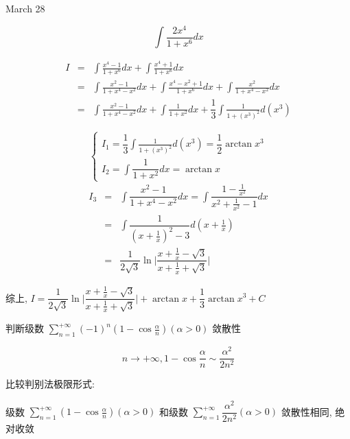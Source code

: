 \textcolor{purplea}{March 28}

\begin{example}[][Exam: 29.4.12]
	$$\int\dfrac{2x^4}{1+x^6}dx$$
\end{example}

\begin{solution}
	
	\begin{eqnarray*}
		I & = & \int\frac{x^4-1}{1+x^6}dx + \int\frac{x^4+1}{1+x^6}dx\\
		  & = & \int\frac{x^2-1}{1+x^4-x^2}dx + \int\frac{x^4-x^2+1}{1+x^6}dx + \int\frac{x^2}{1+x^4-x^2}dx\\
		  & = & \int\frac{x^2-1}{1+x^4-x^2}dx + \int\frac{1}{1+x^2}dx + \dfrac{1}{3}\int\frac{1}{1+(x^3)^{2}}d(x^{3})
	\end{eqnarray*}
	
	$$\begin{cases}
	  I_{1}  =  \displaystyle{\dfrac{1}{3}\int\frac{1}{1+(x^3)^{2}}d(x^{3})} = \dfrac{1}{2}\arctan x^{3}\\
	  I_{2}  =  \displaystyle{\int\dfrac{1}{1+x^2}dx} = \arctan x
	\end{cases}$$
	\begin{eqnarray*}
		I_{3} & = & \displaystyle{\int\dfrac{x^2-1}{1+x^4-x^2}dx =\int \dfrac{1-\frac{1}{x^{2}}}{x^{2}+\frac{1}{x^{2}}-1}dx}\\
			  & = & \displaystyle{\int \dfrac{1}{(x+\frac{1}{x})^{2}-3}d(x+\frac{1}{x})}\\
			  & = & \dfrac{1}{2 \sqrt{3}}\ln \big|\dfrac{x+\frac{1}{x}-\sqrt{3}}{x+\frac{1}{x}+\sqrt{3}}\big|
	\end{eqnarray*}

	综上, $I = \dfrac{1}{2 \sqrt{3}}\ln \big|\dfrac{x+\frac{1}{x}-\sqrt{3}}{x+\frac{1}{x}+\sqrt{3}}\big| + \arctan x + \dfrac{1}{3}\arctan x^{3} + C$
\end{solution}

\begin{example}[][Exam: 29.4.13]
	判断级数 $\sum\limits_{n=1}^{+\infty}(-1)^n(1-\cos \frac{\alpha}{n})(\alpha >0)$ 敛散性
\end{example}

\begin{solution}
	
	$$n\to +\infty,1-\cos \frac{\alpha}{n}\sim \frac{\alpha^2}{2n^2}$$
	
	比较判别法极限形式: 
	
	级数 $\sum\limits_{n=1}^{+\infty}(1-\cos \frac{\alpha}{n})(\alpha >0)$ 和级数 $\sum\limits_{n=1}^{+\infty}\dfrac{\alpha^{2}}{2n^{2}}(\alpha >0)$ 敛散性相同, 绝对收敛
\end{solution}

